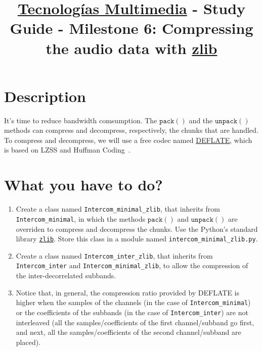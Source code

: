 \title{\href{https://www.ual.es/estudios/grados/presentacion/plandeestudios/asignatura/4015/40154321?idioma=zh_CN}{Tecnologías Multimedia} - Study Guide - Milestone 6: Compressing the audio data with \href{https://zlib.net/}{zlib}}

\maketitle

\section{Description}

It's time to reduce bandwidth comsumption. The $\mathtt{pack()}$ and
the $\mathtt{unpack()}$ methods can compress and decompress,
respectively, the chunks that are handled. To compress and decompress,
we will use a free codec named
\href{https://en.wikipedia.org/wiki/DEFLATE}{DEFLATE}, which is based
on LZSS and Huffman Coding~\cite{nelson96datacompression}.

\section{What you have to do?}

\begin{enumerate}
\item Create a class named \texttt{Intercom\_minimal\_zlib}, that
  inherits from \texttt{Intercom\_minimal}, in which the methods
  $\mathtt{pack()}$ and $\mathtt{unpack()}$ are overriden to compress
  and decompress the chunks. Use the Python's standard library
  \href{https://docs.python.org/3/library/zlib.html}{\texttt{zlib}}. Store
  this class in a module named \texttt{intercom\_minimal\_zlib.py}.
\item Create a class named \texttt{Intercom\_inter\_zlib}, that
  inherits from \texttt{Intercom\_inter} and
  \texttt{Intercom\_minimal\_zlib}, to allow the compression of the
  inter-decorrelated subbands.
\item Notice that, in general, the compression ratio provided by
  DEFLATE is higher when the samples of the channels (in the case of
  \texttt{Intercom\_minimal}) or the coefficients of the subbands (in
  the case of \texttt{Intercom\_inter}) are not interleaved (all the
  samples/coefficients of the first channel/subband go first, and
  next, all the samples/coefficients of the second channel/subband are
  placed).
\end{enumerate}

